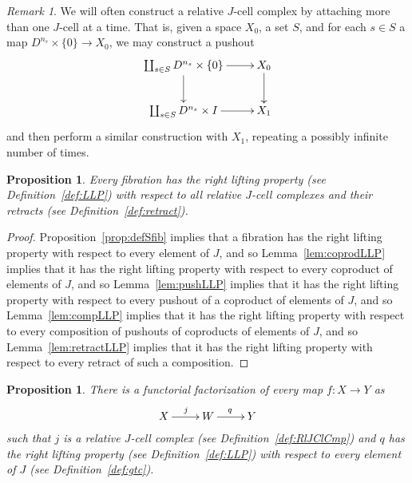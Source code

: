 \documentclass{amsart}
\numberwithin{equation}{section}
\theoremstyle{slplain}
\newtheorem{prop}[equation]{Proposition}
\theoremstyle{definition}
\theoremstyle{remark}
\newtheorem{rem}[equation]{Remark}      %
\newcommand{\propref}{Proposition~\ref}
\newcommand{\lemref}{Lemma~\ref}
\newcommand{\defref}{Definition~\ref}
\begin{document}
\begin{rem}
  \label{rem:MultpleJCells}
  We will often construct a relative $J$-cell complex by attaching
  more than one $J$-cell at a time.  That is, given a space $X_{0}$, a
  set $S$, and for each $s \in S$ a map $D^{n_{s}}\times \{0\} \to
  X_{0}$, we may construct a pushout
  \begin{displaymath}
    \xymatrix{
      {\coprod_{s\in S} D^{n_{s}}\times \{0\}} \ar[r] \ar[d]
      & {X_{0}} \ar[d]\\
      {\coprod_{s\in S} D^{n_{s}}\times I} \ar[r]
      & {X_{1}}
    }
  \end{displaymath}
  and then perform a similar construction with $X_{1}$, repeating a
  possibly infinite number of times.
\end{rem}


\begin{prop}
  \label{prop:JClCmpLift}
  Every fibration has the right lifting property (see
  \defref{def:LLP}) with respect to all relative $J$-cell complexes
  and their retracts (see \defref{def:retract}).
\end{prop}

\begin{proof}
  \propref{prop:defSfib} implies that a fibration has the right
  lifting property with respect to every element of $J$, and so
  \lemref{lem:coprodLLP} implies that it has the right lifting
  property with respect to every coproduct of elements of $J$, and so
  \lemref{lem:pushLLP} implies that it has the right lifting property
  with respect to every pushout of a coproduct of elements of $J$, and
  so \lemref{lem:compLLP} implies that it has the right lifting
  property with respect to every composition of pushouts of coproducts
  of elements of $J$, and so \lemref{lem:retractLLP} implies that it
  has the right lifting property with respect to every retract of such
  a composition.
\end{proof}


\begin{prop}
  \label{prop:TrivCofFact}
  There is a functorial factorization of every map $f\colon X \to Y$
  as
  \begin{displaymath}
    \xymatrix{
      {X} \ar[r]^{j}
      & {W} \ar[r]^{q}
      & {Y}
    }
  \end{displaymath}
  such that $j$ is a relative $J$-cell complex (see
  \defref{def:RlJClCmp}) and $q$ has the right lifting property (see
  \defref{def:LLP}) with respect to every element of $J$ (see
  \defref{def:gtc}).
\end{prop}
\end{document}
